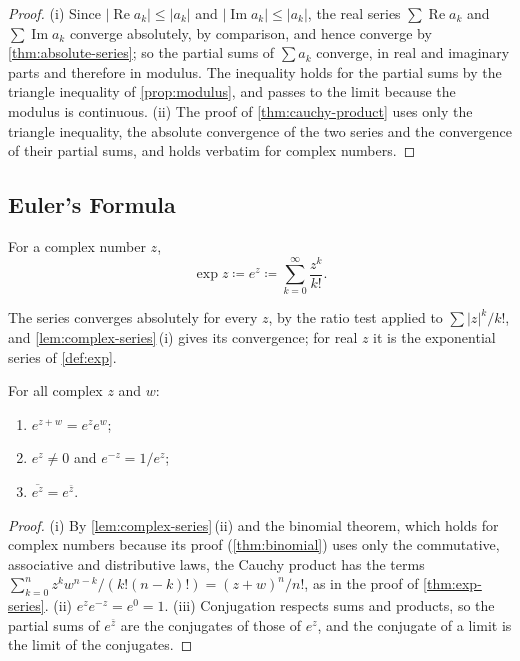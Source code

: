 \begin{proof}
(i) Since $|\operatorname{Re}a_k|\le|a_k|$ and $|\operatorname{Im}a_k|\le|a_k|$, the real series $\sum\operatorname{Re}a_k$ and $\sum\operatorname{Im}a_k$ converge absolutely, by comparison, and hence converge by \cref{thm:absolute-series}; so the partial sums of $\sum a_k$ converge, in real and imaginary parts and therefore in modulus. The inequality holds for the partial sums by the triangle inequality of \cref{prop:modulus}, and passes to the limit because the modulus is continuous. (ii) The proof of \cref{thm:cauchy-product} uses only the triangle inequality, the absolute convergence of the two series and the convergence of their partial sums, and holds verbatim for complex numbers.
\end{proof}

\subsection{Euler's Formula}

\begin{definition}
\label{def:complex-exp}
For a complex number $z$,
\[
\exp z\coloneqq e^z\coloneqq\sum_{k=0}^\infty\frac{z^k}{k!} .
\]
\end{definition}

The series converges absolutely for every $z$, by the ratio test applied to $\sum|z|^k/k!$, and \cref{lem:complex-series}\,(i) gives its convergence; for real $z$ it is the exponential series of \cref{def:exp}.

\begin{theorem}
\label{thm:complex-exp-properties}
For all complex $z$ and $w$:
\begin{enumerate}
\item $e^{z+w}=e^ze^w$;
\item $e^z\ne0$ and $e^{-z}=1/e^z$;
\item $\overline{e^z}=e^{\bar z}$.
\end{enumerate}
\end{theorem}

\begin{proof}
(i) By \cref{lem:complex-series}\,(ii) and the binomial theorem, which holds for complex numbers because its proof (\cref{thm:binomial}) uses only the commutative, associative and distributive laws, the Cauchy product has the terms $\sum_{k=0}^nz^kw^{n-k}/(k!(n-k)!)=(z+w)^n/n!$, as in the proof of \cref{thm:exp-series}. (ii) $e^ze^{-z}=e^0=1$. (iii) Conjugation respects sums and products, so the partial sums of $e^{\bar z}$ are the conjugates of those of $e^z$, and the conjugate of a limit is the limit of the conjugates.
\end{proof}

